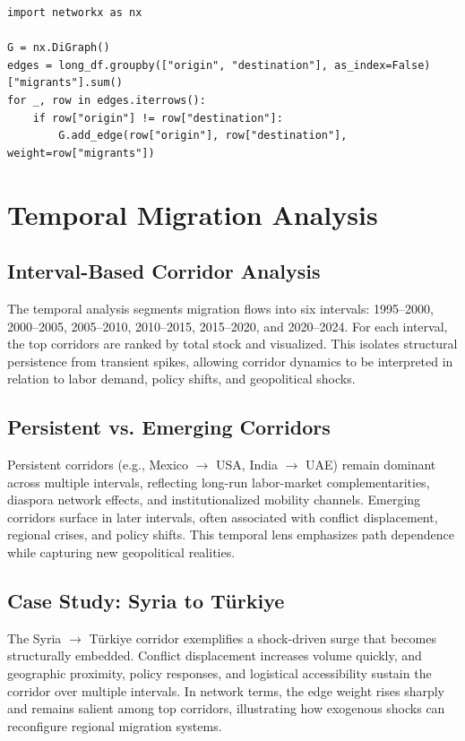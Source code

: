 \documentclass[12pt]{report}
\begin{document}
\begin{lstlisting}
import networkx as nx

G = nx.DiGraph()
edges = long_df.groupby(["origin", "destination"], as_index=False)["migrants"].sum()
for _, row in edges.iterrows():
    if row["origin"] != row["destination"]:
        G.add_edge(row["origin"], row["destination"], weight=row["migrants"])
\end{lstlisting}

\chapter{Temporal Migration Analysis}
\section{Interval-Based Corridor Analysis}
The temporal analysis segments migration flows into six intervals: 1995--2000, 2000--2005, 2005--2010, 2010--2015, 2015--2020, and 2020--2024. For each interval, the top corridors are ranked by total stock and visualized. This isolates structural persistence from transient spikes, allowing corridor dynamics to be interpreted in relation to labor demand, policy shifts, and geopolitical shocks.

\section{Persistent vs. Emerging Corridors}
Persistent corridors (e.g., Mexico $\rightarrow$ USA, India $\rightarrow$ UAE) remain dominant across multiple intervals, reflecting long-run labor-market complementarities, diaspora network effects, and institutionalized mobility channels. Emerging corridors surface in later intervals, often associated with conflict displacement, regional crises, and policy shifts. This temporal lens emphasizes path dependence while capturing new geopolitical realities.

\section{Case Study: Syria to T\"urkiye}
The Syria $\rightarrow$ T\"urkiye corridor exemplifies a shock-driven surge that becomes structurally embedded. Conflict displacement increases volume quickly, and geographic proximity, policy responses, and logistical accessibility sustain the corridor over multiple intervals. In network terms, the edge weight rises sharply and remains salient among top corridors, illustrating how exogenous shocks can reconfigure regional migration systems.
\end{document}
